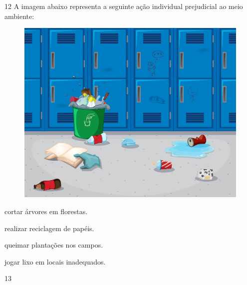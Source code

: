 \num{12} A imagem abaixo representa a seguinte ação individual prejudicial ao meio ambiente:

\begin{figure}[htpb!]
\includegraphics[width=\textwidth]{./imgs/img68.png}
\end{figure}

\begin{minipage}{.5\textwidth}
\begin{escolha}
\item cortar árvores em florestas.

\item realizar reciclagem de papéis.

\item queimar plantações nos campos.

\item jogar lixo em locais inadequados.
\end{escolha}
\end{minipage}


\num{13}

